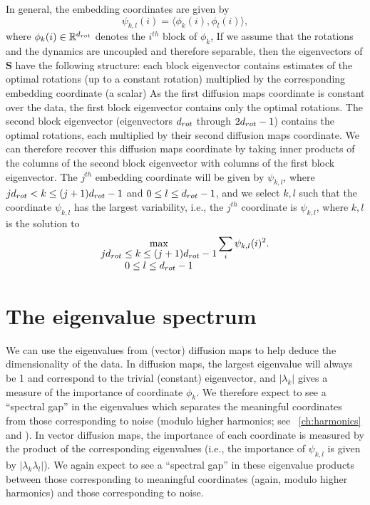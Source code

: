 In general, the embedding coordinates are given by
\begin{equation} \label{eq:vdm_coord}
\psi_{k,l} (i) = \langle \phi_k(i), \phi_l(i) \rangle,
\end{equation}
where $\phi_k(i) \in \mathbb{R}^{d_{rot}}$ denotes the $i^{th}$ block of $\phi_k$,
%
If we assume that the rotations and the dynamics are uncoupled and therefore separable, then the eigenvectors of $\mathbf{S}$ have the following structure: each block eigenvector contains estimates of the optimal rotations (up to a constant rotation) multiplied by the corresponding embedding coordinate (a scalar)
%
As the first diffusion maps coordinate is constant over the data, the first block eigenvector contains only the optimal rotations.
%
The second block eigenvector (eigenvectors $d_{rot}$ through $2d_{rot}-1$) contains the optimal rotations, each multiplied by their second diffusion maps coordinate.
%
We can therefore recover this diffusion maps coordinate by taking inner products of the columns of the second block eigenvector with columns of the first block eigenvector.
%
The $j^{th}$ embedding coordinate will be given by $\psi_{k,l}$, where $jd_{rot}  < k \le (j+1)d_{rot}-1$ and $0 \le l \le d_{rot}-1$,
and we select $k, l$ such that the coordinate $\psi_{k, l}$ has the largest variability, i.e., the $j^{th}$ coordinate is $\psi_{k,l}$, where $k, l$ is the solution to
\begin{equation} \label{eq:first_embed_vdm}
\max_{
\begin{matrix}
jd_{rot} \le k \le (j+1)d_{rot}-1 \\
0 \le l \le d_{rot}-1
\end{matrix}}
 \sum_i \psi_{k,l} (i)^2. 
\end{equation}

\section{The eigenvalue spectrum}

We can use the eigenvalues from (vector) diffusion maps to help deduce the dimensionality of the data.
%
In diffusion maps, the largest eigenvalue will always be 1 and correspond to the trivial (constant) eigenvector, and $|\lambda_k|$ gives a measure of the importance of coordinate $\phi_k$. 
%
We therefore expect to see a ``spectral gap'' in the eigenvalues which separates the meaningful coordinates from those corresponding to noise (modulo higher harmonics; see \chap~\ref{ch:harmonics} and \citep{ferguson2010systematic}).
%
In vector diffusion maps, the importance of each coordinate is measured by the product of the corresponding eigenvalues (i.e., the importance of $\psi_{k,l}$ is given by $| \lambda_k \lambda_l |$). 
%
We again expect to see a ``spectral gap'' in these eigenvalue products between those corresponding to meaningful coordinates (again, modulo higher harmonics) and those corresponding to noise. 